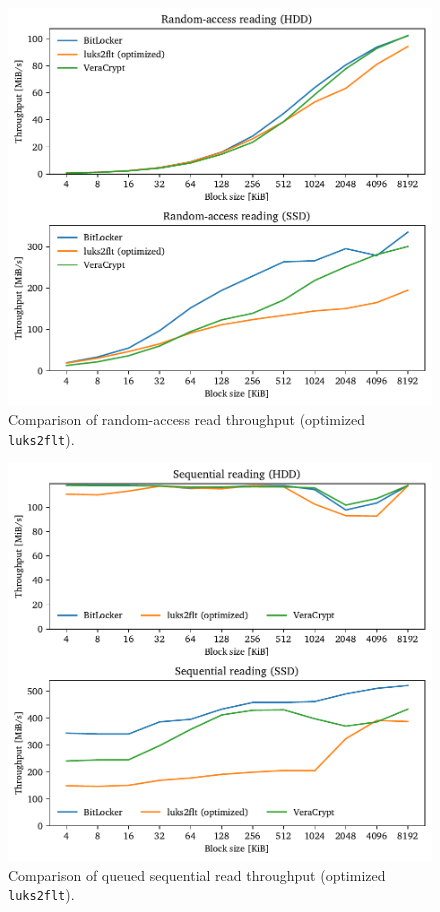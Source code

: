 \begin{figure}[htb!]
	\center
	\includegraphics[scale=1]{../fig/performance.results.optrand.pdf}
	\caption[
		Comparison of random-access read throughput (optimized \texttt{luks2flt})
	]{
		Comparison of random-access read throughput (optimized \texttt{luks2flt}). 
	}
	\label{fig:performance.results.optrand}
\end{figure}

\begin{figure}[htb!]
	\center
	\includegraphics[scale=1]{../fig/performance.results.optseqqueue.pdf}
	\caption[
		Comparison of queued sequential read throughput (optimized \texttt{luks2flt})
	]{
		Comparison of queued sequential read throughput (optimized \texttt{luks2flt}). 
	}
	\label{fig:performance.results.optseqqueue}
\end{figure}

